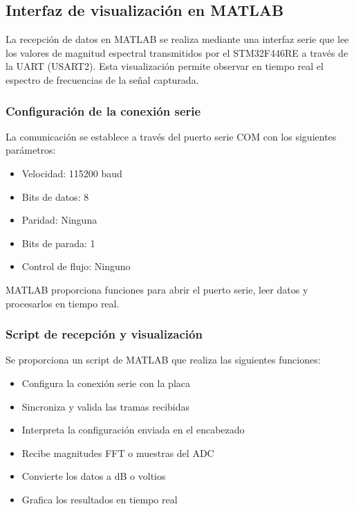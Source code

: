 \documentclass[12pt]{article}
\begin{document}
		\subsection{Interfaz de visualización en MATLAB}

			La recepción de datos en MATLAB se realiza mediante una interfaz serie que lee los valores de magnitud espectral transmitidos por el STM32F446RE a través de la UART (USART2). Esta visualización permite observar en tiempo real el espectro de frecuencias de la señal capturada.

			\subsubsection{Configuración de la conexión serie}

				La comunicación se establece a través del puerto serie COM con los siguientes parámetros:

				\begin{itemize}
					\item Velocidad: 115200 baud
					\item Bits de datos: 8
					\item Paridad: Ninguna
					\item Bits de parada: 1
					\item Control de flujo: Ninguno
				\end{itemize}

				MATLAB proporciona funciones para abrir el puerto serie, leer datos y procesarlos en tiempo real.

			\subsubsection{Script de recepción y visualización}

				Se proporciona un script de MATLAB que realiza las siguientes funciones:

				\begin{itemize}
					\item Configura la conexión serie con la placa
					\item Sincroniza y valida las tramas recibidas
					\item Interpreta la configuración enviada en el encabezado
					\item Recibe magnitudes FFT o muestras del ADC
					\item Convierte los datos a dB o voltios
					\item Grafica los resultados en tiempo real
				\end{itemize}
\end{document}
